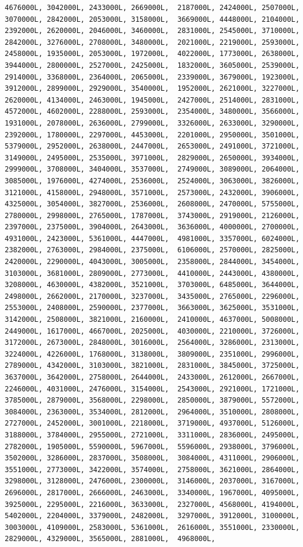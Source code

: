 \documentclass[
]{article}
\begin{document}
\begin{verbatim}
4676000L, 3042000L, 2433000L, 2669000L,  2187000L, 2424000L, 2507000L, 3070000L, 2842000L, 2053000L, 3158000L,  3669000L, 4448000L, 2104000L, 2392000L, 2620000L, 2046000L, 3460000L,  2831000L, 2545000L, 3710000L, 2842000L, 3276000L, 2708000L, 3480000L,  2021000L, 2219000L, 2593000L, 2458000L, 1935000L, 2053000L, 1972000L,  4022000L, 1773000L, 2638000L, 3944000L, 2800000L, 2527000L, 2425000L,  1832000L, 3605000L, 2539000L, 2914000L, 3368000L, 2364000L, 2065000L,  2339000L, 3679000L, 1923000L, 3912000L, 2899000L, 2929000L, 3540000L,  1952000L, 2621000L, 3227000L, 2620000L, 4134000L, 2463000L, 1945000L,  2427000L, 2514000L, 2831000L, 4572000L, 4602000L, 2288000L, 2593000L,  2354000L, 3480000L, 3566000L, 1931000L, 2078000L, 2636000L, 2799000L,  3326000L, 2633000L, 3290000L, 2392000L, 1780000L, 2297000L, 4453000L,  2201000L, 2950000L, 3501000L, 5379000L, 2952000L, 2638000L, 2447000L,  2653000L, 2491000L, 3721000L, 3149000L, 2495000L, 2535000L, 3971000L,  2829000L, 2650000L, 3934000L, 2999000L, 3708000L, 3404000L, 3537000L,  2749000L, 3089000L, 2064000L, 3085000L, 1976000L, 4274000L, 2536000L,  2524000L, 3063000L, 3826000L, 3121000L, 4158000L, 2948000L, 3571000L,  2573000L, 2432000L, 3906000L, 4325000L, 3054000L, 3827000L, 2536000L,  2608000L, 2470000L, 5755000L, 2780000L, 2998000L, 2765000L, 1787000L,  3743000L, 2919000L, 2126000L, 2397000L, 2375000L, 3904000L, 2643000L,  3636000L, 4000000L, 2700000L, 4931000L, 2423000L, 5361000L, 4447000L,  4981000L, 3357000L, 6024000L, 2382000L, 2763000L, 2984000L, 2375000L,  6106000L, 2570000L, 2825000L, 2420000L, 2290000L, 4043000L, 3005000L,  2358000L, 2844000L, 3454000L, 3103000L, 3681000L, 2809000L, 2773000L,  4410000L, 2443000L, 4380000L, 3208000L, 4630000L, 4382000L, 3521000L,  3703000L, 6485000L, 3644000L, 2498000L, 2662000L, 2170000L, 3237000L,  3435000L, 2765000L, 2296000L, 2553000L, 2408000L, 2590000L, 2377000L,  3663000L, 3625000L, 3531000L, 3142000L, 2508000L, 3821000L, 2160000L,  2410000L, 4637000L, 5008000L, 2449000L, 1617000L, 4667000L, 2025000L,  4030000L, 2210000L, 3726000L, 3172000L, 2673000L, 2848000L, 3016000L,  2564000L, 3286000L, 2313000L, 3224000L, 4226000L, 1768000L, 3138000L,  3809000L, 2351000L, 2996000L, 2789000L, 4342000L, 3103000L, 3821000L,  2831000L, 3845000L, 3725000L, 3637000L, 3642000L, 2758000L, 2644000L,  2433000L, 2612000L, 2667000L, 2246000L, 4031000L, 2476000L, 3154000L,  2543000L, 2921000L, 1721000L, 3785000L, 2879000L, 3568000L, 2298000L,  2850000L, 3879000L, 5572000L, 3084000L, 2363000L, 3534000L, 2812000L,  2964000L, 3510000L, 2808000L, 2727000L, 2452000L, 3001000L, 2218000L,  3719000L, 4937000L, 5126000L, 3188000L, 3784000L, 2955000L, 2721000L,  3311000L, 2836000L, 2495000L, 2782000L, 1905000L, 5590000L, 5967000L,  5596000L, 2938000L, 3796000L, 3502000L, 3286000L, 2837000L, 3508000L,  3084000L, 4311000L, 2906000L, 3551000L, 2773000L, 3422000L, 3574000L,  2758000L, 3621000L, 2864000L, 3298000L, 3128000L, 2476000L, 2300000L,  3146000L, 2037000L, 3167000L, 2696000L, 2817000L, 2666000L, 2463000L,  3340000L, 1967000L, 4095000L, 3925000L, 2295000L, 2216000L, 3633000L,  2327000L, 4568000L, 4194000L, 5402000L, 2204000L, 3379000L, 2482000L,  3297000L, 3912000L, 3100000L, 3003000L, 4109000L, 2583000L, 5361000L,  2616000L, 3551000L, 2330000L, 2829000L, 4329000L, 3565000L, 2881000L,  4968000L, 
\end{verbatim}
\end{document}
